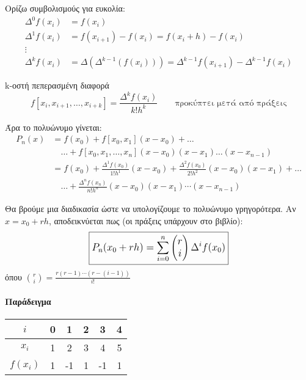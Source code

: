 \documentclass[11pt,a4paper,notitlepage,fleqn,final]{article}
\begin{document}
 	Ορίζω συμβολισμούς για ευκολία:
 	\begin{align*}
 		\Delta^0 f(x_i) &= f(x_i) \\
 		\Delta^1 f(x_i) &=
 		f(x_{i+1}) - f(x_i) = f(x_i+h) - f(x_i) \\
 		\vdots \\
 		\Delta^k f(x_i) &=
 		\Delta \left(\Delta^{k-1}\left(f(x_i)\right)\right)
 		= \Delta^{k-1} f(x_{i+1}) - \Delta^{k-1} f(x_i)
 	\end{align*}

 	\begin{defn}{k-οστή πεπερασμένη διαφορά}{}
 		\[
 			f\left[x_i,x_{i+1},\dots,x_{i+k}\right]
 			= \frac{\Delta^k f(x_i)}{k! h^k}
 			\qquad \text{προκύπτει μετά από πράξεις}
 		\]
 	\end{defn}

 	Άρα το πολυώνυμο γίνεται:
 	\begin{align*}
 	P_n(x) &= f(x_0) + f[x_0,x_1](x-x_0) + \dots
 	\\ & \quad \dots +
 	f[x_0,x_1,\dots,x_n](x-x_0)(x-x_1)\dots(x-x_{n-1})
 	\\ &= f(x_0) + \frac{\Delta^1 f(x_0)}{1!h^1}(x-x_0)
 	+ \frac{\Delta^2 f(x_0)}{2!h^2}(x-x_0)(x-x_1) + \dots \\
 	& \quad \dots + \frac{\Delta^n f(x_n)}{n!h^n}
 	(x-x_0)(x-x_1)\cdots
 	(x-x_{n-1})
 	\end{align*}

 	Θα βρούμε μια διαδικασία ώστε να υπολογίζουμε το πολυώνυμο
 	γρηγορότερα. Αν \( x = x_0+rh \), αποδεικνύεται πως
 	(οι πράξεις υπάρχουν στο βιβλίο):
 	\[
 	\mathlarger{
 		\boxed{
 			P_n(x_0+rh) = \sum_{i=0}^{n}
 			\left(\begin{matrix}
 			r\\i
 			\end{matrix}\right)
 			\Delta^i f(x_0)
 			}
 		}
 	\]
 	όπου \( \displaystyle \binom{r}{i} =
 	\frac{r(r-1)\cdots\left(r-(i-1)\right)}{i!} \)

 	\paragraph{Παράδειγμα}
 	\hspace{0pt}

 	\begin{tabular}{|c|c|c|c|c|c|}
 		\hline
 		\(i\) & 0 & 1 & 2 & 3 & 4\\
 		\hline
 		\(x_i\) & 1 & 2 & 3 & 4 & 5\\
 		\hline
 		\(f(x_i)\) & 1 & -1 & 1 & -1 & 1\\
 		\hline
 	\end{tabular}
\end{document}
